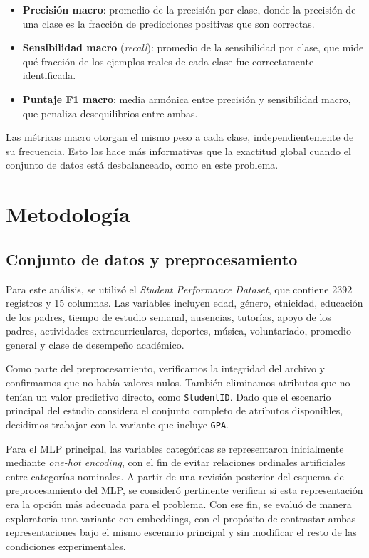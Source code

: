 \documentclass[conference]{IEEEtran}
\begin{document}
\begin{itemize}
  \item \textbf{Precisión macro}: promedio de la precisión por clase, donde la precisión de una clase es la fracción de predicciones positivas que son correctas.
  \item \textbf{Sensibilidad macro} (\textit{recall}): promedio de la sensibilidad por clase, que mide qué fracción de los ejemplos reales de cada clase fue correctamente identificada.
  \item \textbf{Puntaje F1 macro}: media armónica entre precisión y sensibilidad macro, que penaliza desequilibrios entre ambas.
\end{itemize}

Las métricas macro otorgan el mismo peso a cada clase, independientemente de su frecuencia. Esto las hace más informativas que la exactitud global cuando el conjunto de datos está desbalanceado, como en este problema.

\section{Metodología}\label{sec:metodologia}

\subsection{Conjunto de datos y preprocesamiento}

Para este análisis, se utilizó el \textit{Student Performance Dataset}, que contiene 2392 registros y 15 columnas. Las variables incluyen edad, género, etnicidad, educación de los padres, tiempo de estudio semanal, ausencias, tutorías, apoyo de los padres, actividades extracurriculares, deportes, música, voluntariado, promedio general y clase de desempeño académico.

Como parte del preprocesamiento, verificamos la integridad del archivo y confirmamos que no había valores nulos. También eliminamos atributos que no tenían un valor predictivo directo, como \texttt{StudentID}. Dado que el escenario principal del estudio considera el conjunto completo de atributos disponibles, decidimos trabajar con la variante que incluye \texttt{GPA}.

Para el MLP principal, las variables categóricas se representaron inicialmente mediante \textit{one-hot encoding}, con el fin de evitar relaciones ordinales artificiales entre categorías nominales. A partir de una revisión posterior del esquema de preprocesamiento del MLP, se consideró pertinente verificar si esta representación era la opción más adecuada para el problema. Con ese fin, se evaluó de manera exploratoria una variante con embeddings, con el propósito de contrastar ambas representaciones bajo el mismo escenario principal y sin modificar el resto de las condiciones experimentales.
\end{document}
